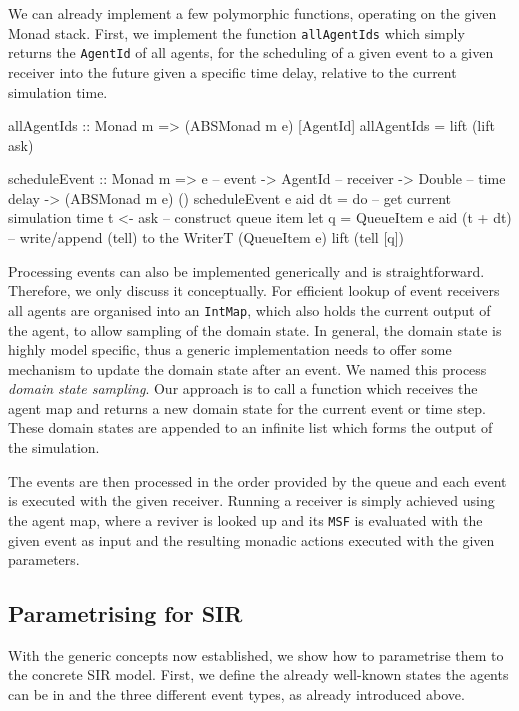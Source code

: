 We can already implement a few polymorphic functions, operating on the given Monad stack. First, we implement the function \texttt{allAgentIds} which simply returns the \texttt{AgentId} of all agents, for the scheduling of a given event to a given receiver into the future given a specific time delay, relative to the current simulation time.
 
\begin{HaskellCode}
allAgentIds :: Monad m => (ABSMonad m e) [AgentId]
allAgentIds = lift (lift ask)

scheduleEvent :: Monad m
              => e        -- event
              -> AgentId  -- receiver
              -> Double   -- time delay
              -> (ABSMonad m e) ()
scheduleEvent e aid dt = do
  -- get current simulation time
  t <- ask
  -- construct queue item
  let q = QueueItem e aid (t + dt)
  -- write/append (tell) to the WriterT (QueueItem e)
  lift (tell [q])
\end{HaskellCode}

Processing events can also be implemented generically and is straightforward. Therefore, we only discuss it conceptually. For efficient lookup of event receivers all agents are organised into an \texttt{IntMap}, which also holds the current output of the agent, to allow sampling of the domain state. In general, the domain state is highly model specific, thus a generic implementation needs to offer some mechanism to update the domain state after an event. We named this process \textit{domain state sampling}. Our approach is to call a function which receives the agent map and returns a new domain state for the current event or time step. These domain states are appended to an infinite list which forms the output of the simulation.

The events are then processed in the order provided by the queue and each event is executed with the given receiver. Running a receiver is simply achieved using the agent map, where a reviver is looked up and its \texttt{MSF} is evaluated with the given event as input and the resulting monadic actions executed with the given parameters.
 
\subsection{Parametrising for SIR}
With the generic concepts now established, we show how to parametrise them to the concrete SIR model. First, we define the already well-known states the agents can be in and the three different event types, as already introduced above.

